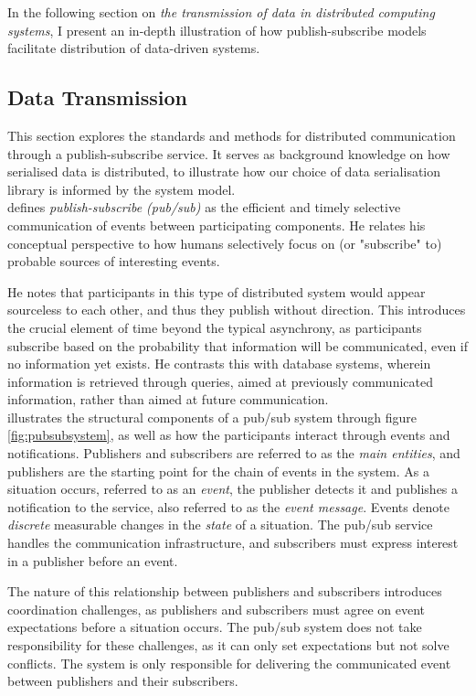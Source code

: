 \documentclass[../report.tex]{subfiles}
\begin{document}
In the following section on \textit{the transmission of data in distributed computing systems}, I present an in-depth illustration of how publish-subscribe models facilitate distribution of data-driven systems.

\subsection{Data Transmission}

This section explores the standards and methods for distributed communication through a publish-subscribe service. It serves as background knowledge on how serialised data is distributed, to illustrate how our choice of data serialisation library is informed by the system model. \\

\cite{tarkoma2012publish} defines \textit{publish-subscribe (pub/sub)} as the efficient and timely selective communication of events between participating components. He relates his conceptual perspective to how humans selectively focus on (or "subscribe" to) probable sources of interesting events.

He notes that participants in this type of distributed system would appear sourceless to each other, and thus they publish without direction. This introduces the crucial element of time beyond the typical asynchrony, as participants subscribe based on the probability that information will be communicated, even if no information yet exists. He contrasts this with database systems, wherein information is retrieved through queries, aimed at previously communicated information, rather than aimed at future communication. \\

\cite{tarkoma2012publish} illustrates the structural components of a pub/sub system through figure \ref{fig:pubsubsystem}, as well as how the participants interact through events and notifications. Publishers and subscribers are referred to as the \textit{main entities}, and publishers are the starting point for the chain of events in the system. As a situation occurs, referred to as an \textit{event}, the publisher detects it and publishes a notification to the service, also referred to as the \textit{event message}. Events denote \textit{discrete} measurable changes in the \textit{state} of a situation. The pub/sub service handles the communication infrastructure, and subscribers must express interest in a publisher before an event.

The nature of this relationship between publishers and subscribers introduces coordination challenges, as publishers and subscribers must agree on event expectations before a situation occurs. The pub/sub system does not take responsibility for these challenges, as it can only set expectations but not solve conflicts. The system is only responsible for delivering the communicated event between publishers and their subscribers. \\
\end{document}

